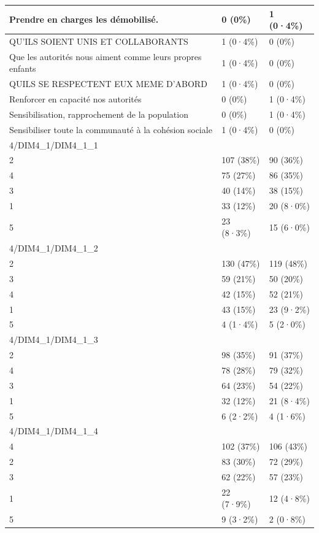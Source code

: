\documentclass[
]{book}
\begin{document}
\begin{tabular}{l|l|l}
\hline
Prendre en charges les  démobilisé. & 0 (0\%) & 1 (0·4\%)\\
\hline
QU'ILS SOIENT UNIS ET COLLABORANTS & 1 (0·4\%) & 0 (0\%)\\
\hline
Que les autorités nous aiment comme leurs propres enfants & 1 (0·4\%) & 0 (0\%)\\
\hline
QUILS SE RESPECTENT EUX MEME D'ABORD & 1 (0·4\%) & 0 (0\%)\\
\hline
Renforcer en capacité nos autorités & 0 (0\%) & 1 (0·4\%)\\
\hline
Sensibilisation, rapprochement de la population & 0 (0\%) & 1 (0·4\%)\\
\hline
Sensibiliser toute la communauté à la cohésion sociale & 1 (0·4\%) & 0 (0\%)\\
\hline
4/DIM4\_1/DIM4\_1\_1 &  & \\
\hline
2 & 107 (38\%) & 90 (36\%)\\
\hline
4 & 75 (27\%) & 86 (35\%)\\
\hline
3 & 40 (14\%) & 38 (15\%)\\
\hline
1 & 33 (12\%) & 20 (8·0\%)\\
\hline
5 & 23 (8·3\%) & 15 (6·0\%)\\
\hline
4/DIM4\_1/DIM4\_1\_2 &  & \\
\hline
2 & 130 (47\%) & 119 (48\%)\\
\hline
3 & 59 (21\%) & 50 (20\%)\\
\hline
4 & 42 (15\%) & 52 (21\%)\\
\hline
1 & 43 (15\%) & 23 (9·2\%)\\
\hline
5 & 4 (1·4\%) & 5 (2·0\%)\\
\hline
4/DIM4\_1/DIM4\_1\_3 &  & \\
\hline
2 & 98 (35\%) & 91 (37\%)\\
\hline
4 & 78 (28\%) & 79 (32\%)\\
\hline
3 & 64 (23\%) & 54 (22\%)\\
\hline
1 & 32 (12\%) & 21 (8·4\%)\\
\hline
5 & 6 (2·2\%) & 4 (1·6\%)\\
\hline
4/DIM4\_1/DIM4\_1\_4 &  & \\
\hline
4 & 102 (37\%) & 106 (43\%)\\
\hline
2 & 83 (30\%) & 72 (29\%)\\
\hline
3 & 62 (22\%) & 57 (23\%)\\
\hline
1 & 22 (7·9\%) & 12 (4·8\%)\\
\hline
5 & 9 (3·2\%) & 2 (0·8\%)\\

\end{tabular}
\end{document}
